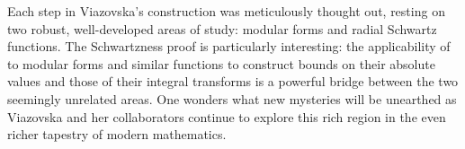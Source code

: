 Each step in Viazovska's construction was meticulously thought out, resting on two robust, well-developed areas of study: modular forms and radial Schwartz functions. The Schwartzness proof is particularly interesting: the applicability of  to modular forms and similar functions to construct bounds on their absolute values and those of their integral transforms is a powerful bridge between the two seemingly unrelated areas. One wonders what new mysteries will be unearthed as Viazovska and her collaborators continue to explore this rich region in the even richer tapestry of modern mathematics.